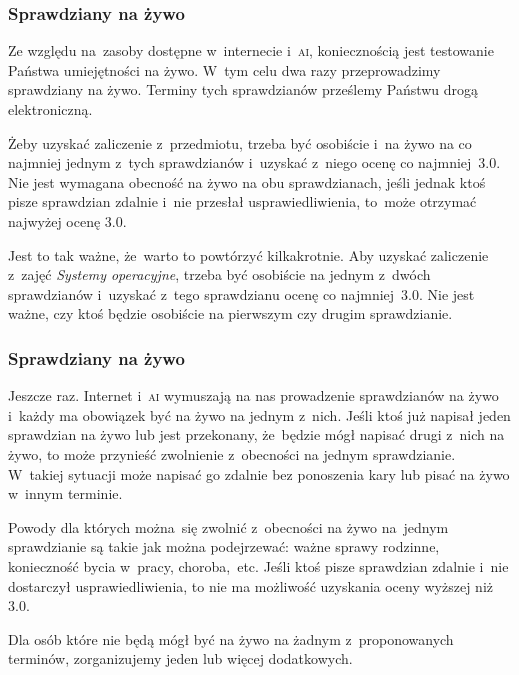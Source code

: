 \documentclass[10pt,t]{beamer}
\begin{document}
\begin{frame}
  \frametitle{Sprawdziany na żywo}


  Ze względu na~zasoby dostępne w~internecie i~\textsc{ai}, koniecznością
  jest testowanie Państwa umiejętności na żywo. W~tym celu dwa razy
  przeprowadzimy sprawdziany na żywo. Terminy tych sprawdzianów prześlemy
  Państwu drogą elektroniczną.

  Żeby uzyskać zaliczenie z~przedmiotu, trzeba być \alert{osobiście}
  i~\alert{na żywo} na co najmniej jednym z~tych sprawdzianów i~uzyskać
  z~niego ocenę co najmniej~$3.0$. Nie jest wymagana obecność na żywo na
  \alert{obu} sprawdzianach, jeśli jednak ktoś pisze sprawdzian zdalnie
  i~nie przesłał usprawiedliwienia, to~może otrzymać najwyżej ocenę $3.0$.

  Jest to tak ważne, że~warto to powtórzyć kilkakrotnie. Aby uzyskać
  zaliczenie z~zajęć \textit{Systemy operacyjne}, trzeba być
  \alert{osobiście} na jednym z~dwóch sprawdzianów i~uzyskać z~tego
  sprawdzianu ocenę co najmniej~$3.0$. Nie jest ważne, czy ktoś będzie
  osobiście na pierwszym czy drugim sprawdzianie.

\end{frame}





\begin{frame}
  \frametitle{Sprawdziany na żywo}


  Jeszcze raz. Internet i~\textsc{ai} wymuszają na nas prowadzenie
  sprawdzianów na żywo i~każdy ma obowiązek być na żywo na \alert{jednym}
  z~nich. Jeśli ktoś już napisał jeden sprawdzian na żywo lub jest
  przekonany, że~będzie mógł napisać drugi z~nich na żywo, to może
  przynieść zwolnienie z~obecności
  na \alert{jednym} sprawdzianie. W~takiej sytuacji może napisać go zdalnie
  bez ponoszenia kary lub pisać na żywo w~innym terminie.

  Powody dla których można~się zwolnić z~obecności na żywo
  na~\alert{jednym} sprawdzianie są takie jak można podejrzewać:
  ważne sprawy rodzinne, konieczność bycia w~pracy, choroba,~etc.
  Jeśli ktoś pisze sprawdzian \alert{zdalnie} i~\alert{nie} dostarczył
  usprawiedliwienia, to nie ma możliwość uzyskania oceny wyższej niż~$3.0$.

  Dla osób które nie będą mógł być na żywo na żadnym z~proponowanych
  terminów, zorganizujemy jeden lub więcej dodatkowych.

\end{frame}
\end{document}
